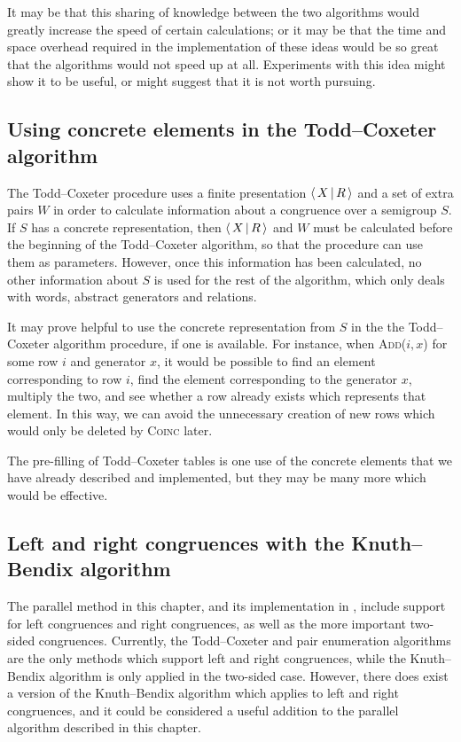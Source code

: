 It may be that this sharing of knowledge between the two algorithms would
greatly increase the speed of certain calculations; or it may be that the time
and space overhead required in the implementation of these ideas would be so great that the
algorithms would not speed up at all.  Experiments with this idea might show it
to be useful, or might suggest that it is not worth pursuing.

\subsection{Using concrete elements in the Todd--Coxeter algorithm}
\label{sec:tc-concrete-elms}
The Todd--Coxeter procedure uses a finite presentation $\left\langle \, X \, \middle| \, R \, \right\rangle$ and a set of
extra pairs $W$ in order to calculate information about a congruence
over a semigroup $S$.  If $S$ has a concrete representation, then $\left\langle \, X \, \middle| \, R \, \right\rangle$ and $W$
must be calculated before the beginning of the Todd--Coxeter algorithm, so that the procedure
can use them as parameters.  However, once this information has been calculated,
no other information about $S$ is used for the rest of the algorithm, which only
deals with words, abstract generators and relations.

It may prove helpful to use the concrete representation from $S$ in the the Todd--Coxeter algorithm
procedure, if one is available.  For instance, when \textsc{Add($i, x$)} for some
row $i$ and generator $x$, it would be possible to find an element corresponding
to row $i$, find the element corresponding to the generator $x$, multiply the
two, and see whether a row already exists which represents that element.  In
this way, we can avoid the unnecessary creation of new rows which would only be
deleted by \textsc{Coinc} later.

The pre-filling of Todd--Coxeter tables is one use of the concrete elements that
we have already described and implemented, but they may be many more which would
be effective.

\subsection{Left and right congruences with the Knuth--Bendix algorithm}
\label{sec:kb-l-r}
The parallel method in this chapter, and its implementation in \libsemigroups{},
include support for left congruences and right congruences, as well as the more
important two-sided congruences.  Currently, the Todd--Coxeter and pair enumeration
algorithms are the only methods which support left and right congruences, while
the Knuth--Bendix algorithm is only applied in the two-sided case.  However, there does exist
a version of the Knuth--Bendix algorithm which applies to left and right congruences, and
it could be considered a useful addition to the parallel algorithm described in
this chapter.

